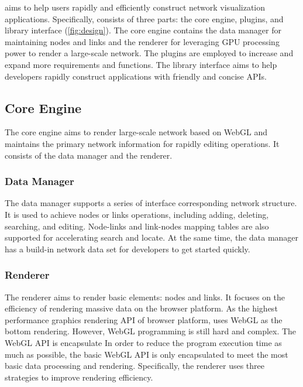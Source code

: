 \name aims to help users rapidly and efficiently construct network visualization applications.
Specifically, \name consists of three parts: the core engine, plugins, and library interface (\autoref{fig:design}).
The core engine contains the data manager for maintaining nodes and links and the renderer for leveraging GPU processing power to render a large-scale network.
The plugins are employed to increase and expand more requirements and functions.
The library interface aims to help developers rapidly construct applications with friendly and concise APIs.


\subsection{Core Engine}
The core engine aims to render large-scale network based on WebGL and maintains the primary network information for rapidly editing operations.
It consists of the data manager and the renderer.

\subsubsection{Data Manager}
The data manager supports a series of interface corresponding network structure.
It is used to achieve nodes or links operations, including adding, deleting, searching, and editing.
Node-links and link-nodes mapping tables are also supported for accelerating search and locate.
At the same time, the data manager has a build-in network data set for developers to get started quickly.

\subsubsection{Renderer}
The renderer aims to render basic elements: nodes and links. It focuses on the efficiency of rendering massive data on the browser platform. As the highest performance graphics rendering API of browser platform, \name uses WebGL as the bottom rendering.
However, WebGL programming is still hard and complex.
The WebGL API is encapsulate
In order to reduce the program execution time as much as possible, the basic WebGL API is only encapsulated to meet the most basic data processing and rendering.
Specifically, the renderer uses three strategies to improve rendering efficiency.

